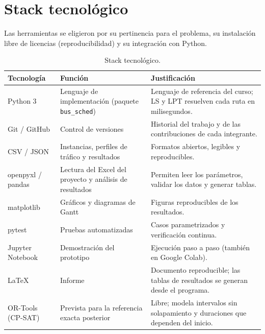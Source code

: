 \section{Stack tecnológico}\label{sec:stack}
Las herramientas se eligieron por su pertinencia para el problema, su instalación libre de licencias (reproducibilidad) y su integración con Python.

\begin{table}[H]
\centering\small
\caption{Stack tecnológico.}
\begin{tabularx}{\textwidth}{L{3.2cm}L{4.6cm}Y}
\toprule
Tecnología & Función & Justificación \\
\midrule
Python 3 & Lenguaje de implementación (paquete \texttt{bus\_sched}) & Lenguaje de referencia del curso; LS y LPT resuelven cada ruta en milisegundos. \\
Git / GitHub & Control de versiones & Historial del trabajo y de las contribuciones de cada integrante. \\
CSV / JSON & Instancias, perfiles de tráfico y resultados & Formatos abiertos, legibles y reproducibles. \\
openpyxl / pandas & Lectura del Excel del proyecto y análisis de resultados & Permiten leer los parámetros, validar los datos y generar tablas. \\
matplotlib & Gráficos y diagramas de Gantt & Figuras reproducibles de los resultados. \\
pytest & Pruebas automatizadas & Casos parametrizados y verificación continua. \\
Jupyter Notebook & Demostración del prototipo & Ejecución paso a paso (también en Google Colab). \\
\LaTeX & Informe & Documento reproducible; las tablas de resultados se generan desde el programa. \\
OR-Tools (CP-SAT) & Prevista para la referencia exacta posterior & Libre; modela intervalos sin solapamiento y duraciones que dependen del inicio. \\
\bottomrule
\end{tabularx}
\end{table}
